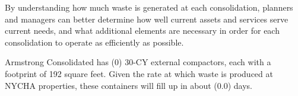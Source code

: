 
    By understanding how much waste is generated at each consolidation, planners and managers
    can better determine how well current assets and services serve current needs, and what additional 
    elements are necessary in order for each consolidation to operate as efficiently as possible. 

    Armstrong Consolidated has (0) 30-CY external compactors, each with a footprint of 192 square feet. Given the rate at which waste is produced at NYCHA properties, these containers will fill
    up in about (0.0) days.